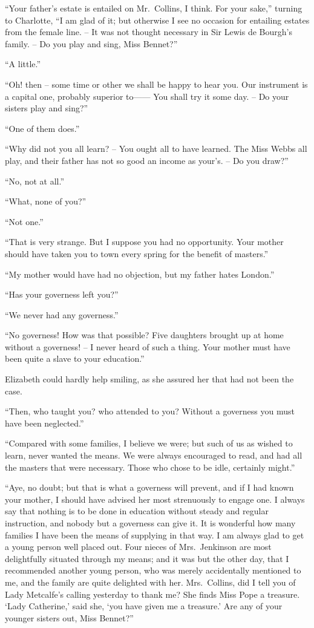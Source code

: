 “Your father’s estate is entailed on Mr.\ Collins, I think.
For your sake,” turning to Charlotte, “I am glad of it;
but otherwise I see no occasion for entailing estates from
the female line. -- It was not thought necessary in Sir
Lewis de Bourgh’s family. -- Do you play and sing, Miss
Bennet?”

“A little.”

“Oh! then -- some time or other we shall be happy to
hear you. Our instrument is a capital one, probably
superior to------ You shall try it some day. -- Do your sisters
play and sing?”

“One of them does.”

“Why did not you all learn? -- You ought all to have
learned. The Miss Webbs all play, and their father has
not so good an income as your’s. -- Do you draw?”

“No, not at all.”

“What, none of you?”

“Not one.”

“That is very strange. But I suppose you had no
opportunity. Your mother should have taken you to
town every spring for the benefit of masters.”

“My mother would have had no objection, but my
father hates London.”

“Has your governess left you?”

“We never had any governess.”

“No governess! How was that possible? Five
daughters brought up at home without a governess! -- I
never heard of such a thing. Your mother must have
been quite a slave to your education.”

Elizabeth could hardly help smiling, as she assured her
that had not been the case.

“Then, who taught you? who attended to you?
Without a governess you must have been neglected.”

“Compared with some families, I believe we were;
but such of us as wished to learn, never wanted the
means. We were always encouraged to read, and had
all the masters that were necessary. Those who chose
to be idle, certainly might.”

“Aye, no doubt; but that is what a governess will
prevent, and if I had known your mother, I should have
advised her most strenuously to engage one. I always
say that nothing is to be done in education without steady
and regular instruction, and nobody but a governess can
give it. It is wonderful how many families I have been
the means of supplying in that way. I am always glad
to get a young person well placed out. Four nieces of
Mrs.\ Jenkinson are most delightfully situated through my
means; and it was but the other day, that I recommended
another young person, who was merely accidentally mentioned
to me, and the family are quite delighted with her.
Mrs.\ Collins, did I tell you of Lady Metcalfe’s calling
yesterday to thank me? She finds Miss Pope a treasure.
‘Lady Catherine,’ said she, ‘you have given me a treasure.’
Are any of your younger sisters out, Miss Bennet?”

